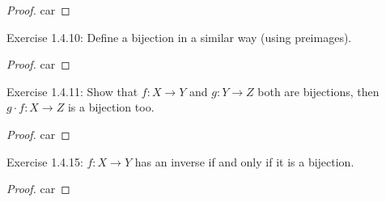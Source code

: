 \documentclass[a4paper]{article}
\begin{document}
\begin{proof}
	car
\end{proof}

\noindent Exercise 1.4.10: Define a bijection in a similar way (using preimages). 

\begin{proof}
	car
\end{proof}

\noindent Exercise 1.4.11: Show that $f: X \to Y$ and $g: Y \to Z$ both are bijections, then $g \cdot f: X \to Z$ is a bijection too.

\begin{proof}
	car
\end{proof}

\noindent Exercise 1.4.15: $f: X \to Y$  has an inverse if and only if it is a bijection.

\begin{proof}
	car
\end{proof}
\end{document}
